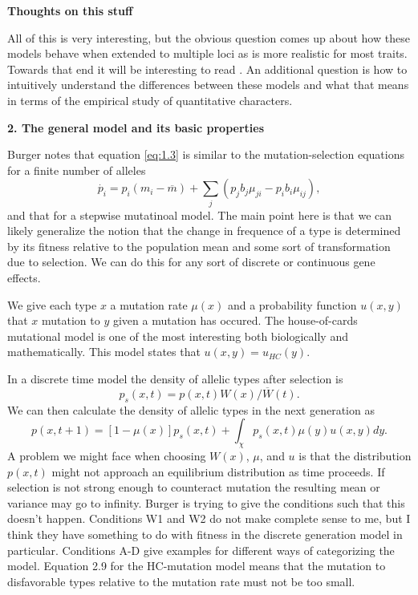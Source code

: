 \begin{flushright}
\textbf{Thoughts on this stuff} \\
\end{flushright}

All of this is very interesting, but the obvious question comes up about how these models behave when extended to
multiple loci as is more realistic for most traits. Towards that end it will be interesting to read \citet{Lande2007}.
An additional question is how to intuitively understand the differences between these models and what that means in terms 
of the empirical study of quantitative characters. 

\begin{flushright}
\textbf{2. The general model and its basic properties}\\
\end{flushright}

Burger notes that equation \ref{eq:1.3} is similar to the mutation-selection equations for a finite number of alleles
\begin{equation}
\dot{p_i}=p_i(m_i-\overline{m}) + \sum_j\left( p_jb_j\mu_{ji}-p_ib_i\mu_{ij}\right),
\end{equation}
and that for a stepwise mutatinoal model. The main point here is that we can likely generalize the notion that the
change in frequence of a type is determined by its fitness relative to the population mean and some sort of
transformation due to selection. We can do this for any sort of discrete or continuous gene effects.

We give each type $x$ a mutation rate $\mu(x)$ and a probability function $u(x,y)$ that $x$ mutation to $y$ given a
mutation has occured. The house-of-cards mutational model is one of the most interesting both biologically and
mathematically. This model states that $u(x,y)=u_{HC}(y)$. 

In a discrete time model the density of allelic types after selection is 
\begin{equation}\label{eq:sel}
p_s(x,t) = p(x,t)W(x)/\overline{W}(t).
\end{equation}
We can then calculate the density of allelic types in the next generation as
\begin{equation}\label{eq:mut}
p(x,t+1) = \left[1-\mu(x)\right]p_s(x,t) + \int_{\chi}p_s(x,t)\mu(y)u(x,y)dy.
\end{equation}
A problem we might face when choosing $W(x)$, $\mu$, and $u$ is that the distribution $p(x,t)$ might not approach an
equilibrium distribution as time proceeds. If selection is not strong enough to counteract mutation the resulting mean
or variance may go to infinity. Burger is trying to give the conditions such that this doesn't happen. Conditions W1 and
W2 do not make complete sense to me, but I think they have something to do with fitness in the discrete generation model
in particular. Conditions A-D give examples for different ways of categorizing the model. Equation 2.9 for the
HC-mutation model means that the mutation to disfavorable types relative to the mutation rate must not be too small.


